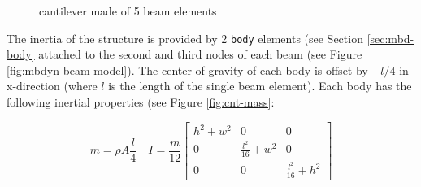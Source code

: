 \begin{figure}[htbp!]
	    \centering
    	\caption{cantilever made of 5 beam elements}
		\label{fig:cnt-beams}
\end{figure}

The inertia of the structure is provided by 2 \texttt{body} elements (see Section \ref{sec:mbd-body} attached to the second and third nodes of each beam (see Figure \ref{fig:mbdyn-beam-model}). The center of gravity of each body is offset by $-l/4$ in x-direction (where $l$ is the length of the single beam element). Each body has the following inertial properties (see Figure \ref{fig:cnt-mass}: 

\begin{equation}
    m = \rho A \frac{l}{4} \quad I = \frac{m}{12} \begin{bmatrix} h^2+w^2 & 0 & 0 \\ 0 & \frac{l^2}{16} + w^2 & 0 \\ 0 & 0 & \frac{l^2}{16} + h^2 \end{bmatrix}
    \label{eq:body-inertia}
\end{equation}



